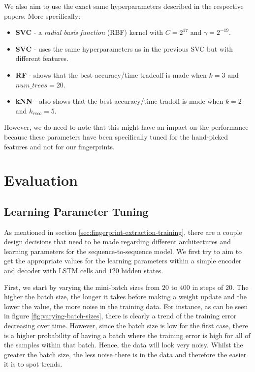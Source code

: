 We also aim to use the exact same hyperparameters described in the respective papers. More specifically:
\begin{itemize}
  \item \textbf{SVC} \cite{panchenko1} - a \textit{radial basis function} (RBF) kernel with $C = 2^{17}$ and $\gamma = 2^{-19}$.
  \item \textbf{SVC} \cite{panchenko2} - uses the same hyperparameters as in the previous SVC but with different features.
  \item \textbf{RF} \cite{kfingerprinting} - shows that the best accuracy/time tradeoff is made when $k = 3$ and $\textit{num\_trees} = 20$.
  \item \textbf{kNN} \cite{wang_cai_johnson_nithyanand_goldberg_2014} - also shows that the best accuracy/time tradoff is made when $k = 2$ and $k_{\textit{reco}} = 5$.
\end{itemize}

However, we do need to note that this might have an impact on the performance because these parameters have been specifically tuned for the hand-picked features and not for our fingerprints.

\section{Evaluation}

\subsection{Learning Parameter Tuning}

As mentioned in section \ref{sec:fingerprint-extraction-training}, there are a couple design decisions that need to be made regarding different architectures and learning parameters for the sequence-to-sequence model.
We first try to aim to get the appropriate values for the learning parameters within a simple encoder and decoder with LSTM cells and $120$ hidden states.

First, we start by varying the mini-batch sizes from $20$ to $400$ in steps of $20$.
The higher the batch size, the longer it takes before making a weight update and the lower the value, the more noise in the training data.
For instance, as can be seen in figure \ref{fig:varying-batch-sizes}, there is clearly a trend of the training error decreasing over time.
However, since the batch size is low for the first case, there is a higher probability of having a batch where the training error is high for all of the samples within that batch.
Hence, the data will look very noisy.
Whilst the greater the batch size, the less noise there is in the data and therefore the easier it is to spot trends.


